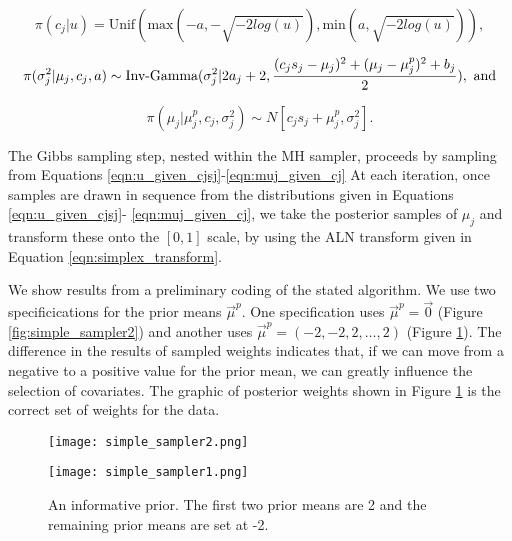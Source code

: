 \begin{equation}
\pi(c_j \vert u) = \text{Unif}(\text{max}(-a,-\sqrt{-2log(u)}), \text{min}(a,\sqrt{-2log(u)} )),
\end{equation}

\begin{equation}
\pi(\sigma^2_j \vert \mu_j, c_j, a) \sim \text{Inv-Gamma}({\sigma_j^2}\vert{2a_j+2},{\frac{(c_js_j-\mu_j)^2+ (\mu_j-\mu_j^p)^2+b_j}{2}}), \text{ and}
\end{equation}

\begin{equation}\label{eqn:muj_given_cj}
\pi(\mu_j\vert \mu_j^p, c_j, \sigma^2_j)\sim N[c_js_j+\mu_j^p, \sigma_j^2].
\end{equation}

 The Gibbs sampling step, nested within the MH sampler, proceeds by sampling from Equations \ref{eqn:u_given_cjsj}-\ref{eqn:muj_given_cj}
At each iteration, once samples are drawn in sequence from the distributions given in Equations \ref{eqn:u_given_cjsj}- \ref{eqn:muj_given_cj}, we take the posterior samples of $\mu_j$ and transform these onto the $[0,1]$ scale, by using the ALN transform given in Equation \ref{eqn:simplex_transform}. 

We show results from a preliminary coding of the stated algorithm. We use two specificications for the prior means $\vec{\mu}^p$. One specification uses  $\vec{\mu}^p = \vec{0}$ (Figure \ref{fig:simple_sampler2}) and another uses $\vec{\mu}^p=(-2,-2,2,\dots,2)$ (Figure \ref{fig:simple_sampler1}). The difference in the results of sampled weights indicates that, if we can move from a negative to a positive value for the prior mean, we can greatly influence the selection of covariates. The graphic of posterior weights shown in Figure \ref{fig:simple_sampler1} is the correct set of weights for the data. 



 \begin{figure}[ht]
\begin{minipage}[b]{0.45\linewidth}
\centering
\texttt{[image: simple\_sampler2.png]}
\caption[Results for the zero mean prior]{A zero mean prior. Note that the two covariates that should have large probabilities are covariates 1 and 2.}
\label{fig:simple_sampler2}
\end{minipage}
\hspace{0.5cm}
\begin{minipage}[b]{0.45\linewidth}
\centering
\texttt{[image: simple\_sampler1.png]}
\caption[Results for the informative prior]{An informative prior. The first two prior means are 2 and the remaining prior means are set at -2.}
\label{fig:simple_sampler1}
\end{minipage}
\end{figure}


